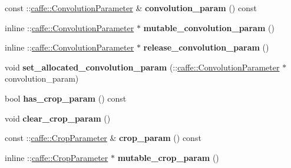 \begin{DoxyCompactItemize}
const \+::\mbox{\hyperlink{classcaffe_1_1_convolution_parameter}{caffe\+::\+Convolution\+Parameter}} \& {\bfseries convolution\+\_\+param} () const
\item 
\mbox{\label{classcaffe_1_1_layer_parameter_a9f4c3e4c082a784fd71b1b9644a89025}} 
inline \+::\mbox{\hyperlink{classcaffe_1_1_convolution_parameter}{caffe\+::\+Convolution\+Parameter}} $\ast$ {\bfseries mutable\+\_\+convolution\+\_\+param} ()
\item 
\mbox{\label{classcaffe_1_1_layer_parameter_a6d731f9f2d47348c11efaf86354fcdb6}} 
inline \+::\mbox{\hyperlink{classcaffe_1_1_convolution_parameter}{caffe\+::\+Convolution\+Parameter}} $\ast$ {\bfseries release\+\_\+convolution\+\_\+param} ()
\item 
\mbox{\label{classcaffe_1_1_layer_parameter_a87c78eeda270674b91e2dca5ffca2137}} 
void {\bfseries set\+\_\+allocated\+\_\+convolution\+\_\+param} (\+::\mbox{\hyperlink{classcaffe_1_1_convolution_parameter}{caffe\+::\+Convolution\+Parameter}} $\ast$convolution\+\_\+param)
\item 
\mbox{\label{classcaffe_1_1_layer_parameter_ad4dd33af1b90abd1c1300a9766a776fb}} 
bool {\bfseries has\+\_\+crop\+\_\+param} () const
\item 
\mbox{\label{classcaffe_1_1_layer_parameter_a21f7d51e72825703a1f1d158c7468d67}} 
void {\bfseries clear\+\_\+crop\+\_\+param} ()
\item 
\mbox{\label{classcaffe_1_1_layer_parameter_af06a99b7ab1b6a5a7a40bff238ce83a5}} 
const \+::\mbox{\hyperlink{classcaffe_1_1_crop_parameter}{caffe\+::\+Crop\+Parameter}} \& {\bfseries crop\+\_\+param} () const
\item 
\mbox{\label{classcaffe_1_1_layer_parameter_a7453a9b8df1110ee051548621d69bd51}} 
inline \+::\mbox{\hyperlink{classcaffe_1_1_crop_parameter}{caffe\+::\+Crop\+Parameter}} $\ast$ {\bfseries mutable\+\_\+crop\+\_\+param} ()
\item 
\mbox{\label{classcaffe_1_1_layer_parameter_ae3ebf5d626c4baf78847da035f91cad0}} 

\end{DoxyCompactItemize}
